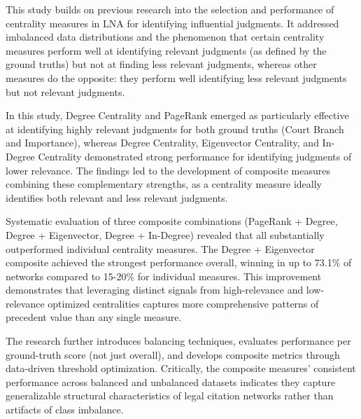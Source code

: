 
This study builds on previous research into the selection and performance of centrality measures in LNA for identifying influential judgments. It addressed imbalanced data distributions and the phenomenon that certain centrality measures perform well at identifying relevant judgments (as defined by the ground truths) but not at finding less relevant judgments, whereas other measures do the opposite: they perform well identifying less relevant judgments but not relevant judgments.

In this study, Degree Centrality and PageRank emerged as particularly effective at identifying highly relevant judgments for both ground truths (Court Branch and Importance), whereas Degree Centrality, Eigenvector Centrality, and In-Degree Centrality demonstrated strong performance for identifying judgments of lower relevance. The findings led to the development of composite measures combining these complementary strengths, as a centrality measure ideally identifies both relevant and less relevant judgments.

Systematic evaluation of three composite combinations (PageRank + Degree, Degree + Eigenvector, Degree + In-Degree) revealed that all substantially outperformed individual centrality measures. The Degree + Eigenvector composite achieved the strongest performance overall, winning in up to 73.1\% of networks compared to 15-20\% for individual measures. This improvement demonstrates that leveraging distinct signals from high-relevance and low-relevance optimized centralities captures more comprehensive patterns of precedent value than any single measure.

The research further introduces balancing techniques, evaluates performance per ground-truth score (not just overall), and develops composite metrics through data-driven threshold optimization. Critically, the composite measures' consistent performance across balanced and unbalanced datasets indicates they capture generalizable structural characteristics of legal citation networks rather than artifacts of class imbalance.
